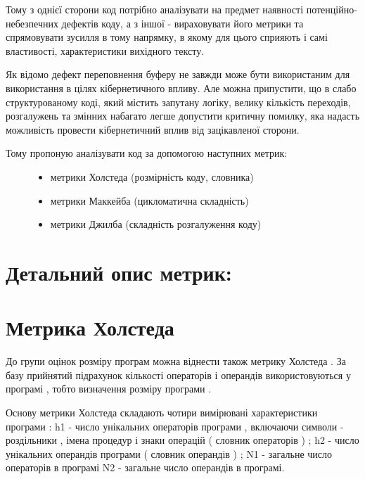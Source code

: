 Тому з однієї сторони код потрібно аналізувати на предмет наявності потенційно-небезпечних дефектів коду, а з іншої - вираховувати його метрики та спрямовувати зусилля в тому напрямку, в якому для цього сприяють і самі властивості, характеристики вихідного тексту.

Як відомо дефект переповнення буферу не завжди може бути використаним для використання в цілях кібернетичного впливу.
Але можна припустити, що в слабо структурованому коді, який містить запутану логіку, велику кількість переходів, розгалужень та змінних набагато легше допустити критичну помилку, яка надасть можливість провести кібернетичний вплив від зацікавленої сторони.
\begin{description}
\item[{Тому пропоную аналізувати код за допомогою наступних метрик:}] \leavevmode\begin{itemize}
\item {} 
метрики Холстеда (розмірність коду, словника)

\item {} 
метрики Маккейба (цикломатична складність)

\item {} 
метрики Джилба (складність розгалуження коду)

\end{itemize}

\end{description}


\section{Детальний опис метрик:}
\label{2section:id9}

\section{Метрика Холстеда}
\label{2section:id10}
До групи оцінок розміру програм можна віднести також метрику Холстеда . За базу прийнятий підрахунок кількості операторів і операндів використовуються у програмі , тобто визначення розміру програми .

Основу метрики Холстеда складають чотири вимірювані характеристики програми : h1 - число унікальних операторів програми , включаючи символи - роздільники , імена процедур і знаки операцій ( словник операторів ) ; h2 - число унікальних операндів програми ( словник операндів ) ; N1 - загальне число операторів в програмі N2 - загальне число операндів в програмі.

